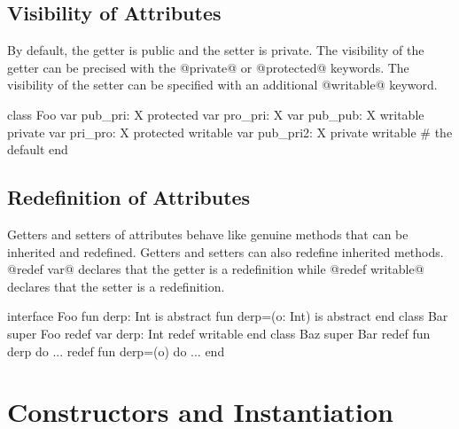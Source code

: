 \subsection{Visibility of Attributes}\label{attribute visibility}

By default, the getter is public and the setter is private.
The visibility of the getter can be precised with the @private@ or @protected@ keywords.
The visibility of the setter can be specified with an additional @writable@ keyword.

\begin{lst}
class Foo
	var pub_pri: X
	protected var pro_pri: X
	var pub_pub: X writable
	private var pri_pro: X protected writable
	var pub_pri2: X private writable # the default
end
\end{lst}

\subsection{Redefinition of Attributes}\label{redef var}

Getters and setters of attributes behave like genuine methods that can be inherited and redefined.
Getters and setters can also redefine inherited methods.
@redef var@ declares that the getter is a redefinition while @redef writable@ declares that the setter is a redefinition.

\begin{lst}
interface Foo
	fun derp: Int is abstract
	fun derp=(o: Int) is abstract
end
class Bar
	super Foo
	redef var derp: Int redef writable
end
class Baz
	super Bar
	redef fun derp do ...
	redef fun derp=(o) do ...
end
\end{lst}

\section{Constructors and Instantiation}\label{init}

